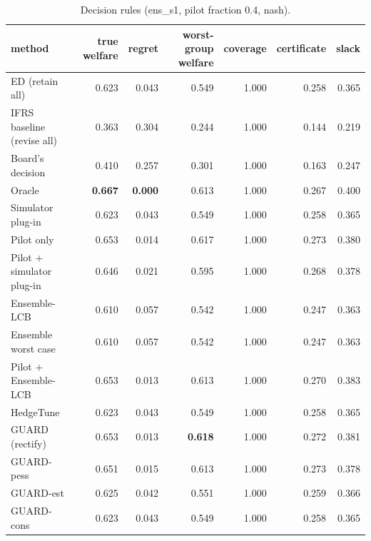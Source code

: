 \begin{table}[t]
\centering
\small
\begin{tabular}{lrrrrrr}
\toprule
method & true welfare & regret & worst-group welfare & coverage & certificate & slack \\
\midrule
ED (retain all) & 0.623 & 0.043 & 0.549 & 1.000 & 0.258 & 0.365 \\
IFRS baseline (revise all) & 0.363 & 0.304 & 0.244 & 1.000 & 0.144 & 0.219 \\
Board's decision & 0.410 & 0.257 & 0.301 & 1.000 & 0.163 & 0.247 \\
Oracle & \textbf{0.667} & \textbf{0.000} & 0.613 & 1.000 & 0.267 & 0.400 \\
Simulator plug-in & 0.623 & 0.043 & 0.549 & 1.000 & 0.258 & 0.365 \\
Pilot only & 0.653 & 0.014 & 0.617 & 1.000 & 0.273 & 0.380 \\
Pilot + simulator plug-in & 0.646 & 0.021 & 0.595 & 1.000 & 0.268 & 0.378 \\
Ensemble-LCB & 0.610 & 0.057 & 0.542 & 1.000 & 0.247 & 0.363 \\
Ensemble worst case & 0.610 & 0.057 & 0.542 & 1.000 & 0.247 & 0.363 \\
Pilot + Ensemble-LCB & 0.653 & 0.013 & 0.613 & 1.000 & 0.270 & 0.383 \\
HedgeTune & 0.623 & 0.043 & 0.549 & 1.000 & 0.258 & 0.365 \\
GUARD (rectify) & 0.653 & 0.013 & \textbf{0.618} & 1.000 & 0.272 & 0.381 \\
GUARD-pess & 0.651 & 0.015 & 0.613 & 1.000 & 0.273 & 0.378 \\
GUARD-est & 0.625 & 0.042 & 0.551 & 1.000 & 0.259 & 0.366 \\
GUARD-cons & 0.623 & 0.043 & 0.549 & 1.000 & 0.258 & 0.365 \\
\bottomrule
\end{tabular}
\caption{Decision rules (ens\_s1, pilot fraction 0.4, nash).}
\label{tab:methods-nash}
\end{table}
